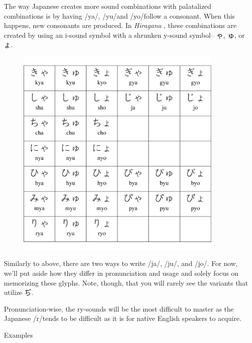 \par{ The way Japanese creates more sound combinations with palatalized combinations is by having \slash ya\slash , \slash yu\slash  and \slash yo\slash  follow a consonant. When this happens, new consonants are produced. In \emph{Hiragana }, these combinations are created by using an i-sound symbol with a shrunken y-sound symbol-- ゃ, ゅ, or ょ. }

\begin{figure}[h]
\centering

\includegraphics[width=0.9\textwidth]{figs/第01章/第3課:_hiragana_fig/hiragana03.png}

\end{figure}
 
\par{ Similarly to above, there are two ways to write \slash ja\slash , \slash ju\slash , and \slash jo\slash . For now, we'll put aside how they differ in pronunciation and usage and solely focus on memorizing these glyphs. Note, though, that you will rarely see the variants that utilize ぢ. }

\par{ Pronunciation-wise, the ry-sounds will be the most difficult to master as the Japanese \slash r\slash  tends to be difficult as it is for native English speakers to acquire. }

\begin{center}
Examples  
\end{center}

